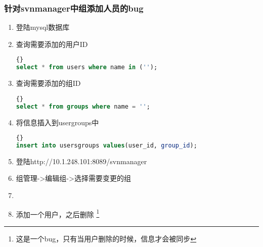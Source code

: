 \documentclass[11pt,a4paper]{article}
\begin{document}
	\subsubsection{针对svnmanager中组添加人员的bug}
		\begin{enumerate}[step 1]
		\item 登陆mysql数据库
		\item 查询需要添加的用户ID
		\begin{lstlisting}[language={SQL}] {}
select * from users where name in ('');
		\end{lstlisting}
		\item 查询需要添加的组ID
		\begin{lstlisting}[language={SQL}]{}
select * from groups where name = '';
		\end{lstlisting}
		\item 将信息插入到usergroups中
		\begin{lstlisting}[language={SQL}]{}
insert into usersgroups values(user_id, group_id); 
		\end{lstlisting}
		\item 登陆http://10.1.248.101:8089/svnmanager
		\item 组管理->编辑组->选择需要变更的组
		\item {\color{red}{不要选择任何人员，点击确认}}
		\item 添加一个用户，之后删除 \footnote{这是一个bug，只有当用户删除的时候，信息才会被同步}
		\end{enumerate}	
	
\end{document}
